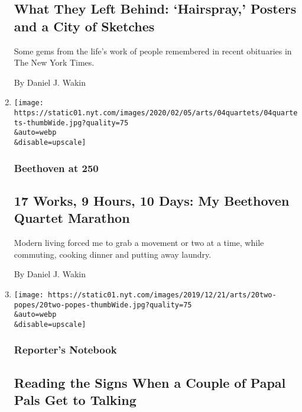 \begin{enumerate}
{  \subsection{What They Left Behind: `Hairspray,' Posters and a City of
  Sketches}\label{what-they-left-behind-hairspray-posters-and-a-city-of-sketches}}

  Some gems from the life's work of people remembered in recent
  obituaries in The New York Times.

  By Daniel J. Wakin
\item
  \href{/2020/02/04/arts/music/beethoven-string-quartets.html}{}

  \texttt{[image: https://static01.nyt.com/images/2020/02/05/arts/04quartets/04quartets-thumbWide.jpg?quality=75\\\&auto=webp\\\&disable=upscale]}

  \hypertarget{beethoven-at-250}{%
  \subsubsection{Beethoven at 250}\label{beethoven-at-250}}

  \hypertarget{17-works-9-hours-10-days-my-beethoven-quartet-marathon}{%
  \subsection{17 Works, 9 Hours, 10 Days: My Beethoven Quartet
  Marathon}\label{17-works-9-hours-10-days-my-beethoven-quartet-marathon}}

  Modern living forced me to grab a movement or two at a time, while
  commuting, cooking dinner and putting away laundry.

  By Daniel J. Wakin
\item
  \href{/2019/12/20/movies/the-two-popes-true-story.html}{}

  \texttt{[image: https://static01.nyt.com/images/2019/12/21/arts/20two-popes/20two-popes-thumbWide.jpg?quality=75\\\&auto=webp\\\&disable=upscale]}

  \hypertarget{reporters-notebook}{%
  \subsubsection{Reporter's Notebook}\label{reporters-notebook}}

  \hypertarget{reading-the-signs-when-a-couple-of-papal-pals-get-to-talking}{%
  \subsection{Reading the Signs When a Couple of Papal Pals Get to
  Talking}\label{reading-the-signs-when-a-couple-of-papal-pals-get-to-talking}}


\end{enumerate}
